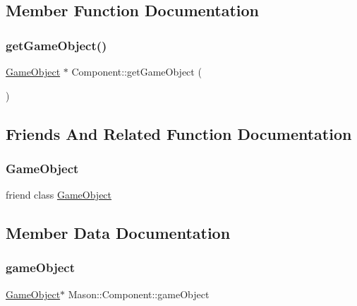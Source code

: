\subsection{Member Function Documentation}
\hypertarget{class_mason_1_1_component_abed36db99f1ee0ba84a5fb8485e17428}{}\label{class_mason_1_1_component_abed36db99f1ee0ba84a5fb8485e17428} 
\subsubsection{\texorpdfstring{get\+Game\+Object()}{getGameObject()}}
{\footnotesize\ttfamily \hyperlink{class_mason_1_1_game_object}{Game\+Object} $\ast$ Component\+::get\+Game\+Object (\begin{DoxyParamCaption}{ }\end{DoxyParamCaption})}



\subsection{Friends And Related Function Documentation}
\hypertarget{class_mason_1_1_component_a00df87c957d8f7ee0fc51f07a0542f4a}{}\label{class_mason_1_1_component_a00df87c957d8f7ee0fc51f07a0542f4a} 
\subsubsection{\texorpdfstring{Game\+Object}{GameObject}}
{\footnotesize\ttfamily friend class \hyperlink{class_mason_1_1_game_object}{Game\+Object}\hspace{0.3cm}{\ttfamily [friend]}}



\subsection{Member Data Documentation}
\hypertarget{class_mason_1_1_component_a30030370c35f5562cbbbb0927b0448c8}{}\label{class_mason_1_1_component_a30030370c35f5562cbbbb0927b0448c8} 
\subsubsection{\texorpdfstring{game\+Object}{gameObject}}
{\footnotesize\ttfamily \hyperlink{class_mason_1_1_game_object}{Game\+Object}$\ast$ Mason\+::\+Component\+::game\+Object\hspace{0.3cm}{\ttfamily [protected]}}



